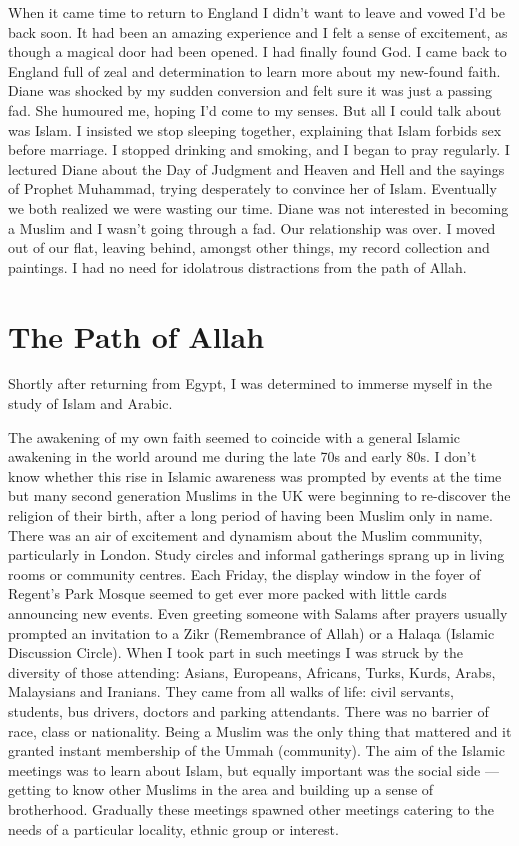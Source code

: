 \documentclass[12pt]{memoir}
\newcommand{\cmt}[2]{#1} %
\begin{document}
When it came time to return to England I didn’t want to leave
and vowed I’d be back soon.
It had been an amazing experience and I felt a sense of excitement,
as though a magical door had been opened.
I had finally found God.
I came back to England full of zeal and determination
to learn more about my new-found faith.
Diane was shocked by my sudden conversion
and felt sure it was just a passing fad.
She humoured me, hoping I’d come to my senses.
But all I could talk about was Islam.
I insisted we stop sleeping together,
explaining that Islam forbids sex before marriage.
I stopped drinking and smoking, and I began to pray regularly.
I lectured Diane about the Day of Judgment and Heaven and Hell
and the sayings of Prophet Muhammad,
trying desperately to convince her of Islam.
Eventually we both realized we were wasting our time.
Diane was not interested in becoming a Muslim
and I wasn’t going through a fad.
Our relationship was over.
I moved out of our flat, leaving behind, amongst other things,
my record collection and paintings.
I had no need for idolatrous distractions from the path of Allah.


\chapter{The Path of Allah}


Shortly after returning from Egypt,
I was determined to immerse myself in the study of Islam and Arabic.

The awakening of my own faith seemed to coincide
with a general Islamic awakening in the world around me
during the late 70s and early 80s.
I don’t know whether this rise in Islamic awareness was prompted by events
at the time but many second generation Muslims in the UK
were beginning to \cmt{re-discover}{rediscover} the religion of their birth,
after a long period of having been Muslim only in name.
There was an air of excitement and dynamism about the Muslim community,
particularly in London.
Study circles and informal gatherings sprang up
in living rooms or community centres.
Each Friday, the display window in the foyer of Regent’s Park Mosque
seemed to get ever more packed with little cards announcing new events.
Even greeting someone with Salams after prayers usually prompted an invitation
to a Zikr (Remembrance of Allah) or a Halaqa (Islamic Discussion Circle).
When I took part in such meetings
I was struck by the diversity of those attending:
Asians, Europeans, Africans, Turks, Kurds, Arabs, Malaysians and Iranians.
They came from all walks of life: civil servants, students, bus drivers,
doctors and parking attendants.
There was no barrier of race, class or nationality.
Being a Muslim was the only thing that mattered
and it granted instant membership of the Ummah (community).
The aim of the Islamic meetings was to learn about Islam,
but equally important was the social side —
getting to know other Muslims in the area
and building up a sense of brotherhood.
Gradually these meetings spawned other meetings
catering to the needs of a particular locality, ethnic group or interest.
\end{document}
